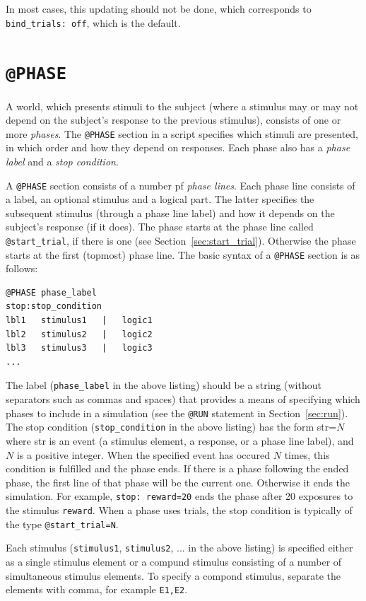 \documentclass[11pt]{article}
\newcommand{\scr}[1]{\lstinline|#1|}
\begin{document}
In most cases, this updating should not be done, which corresponds to \scr{bind_trials: off}, which is the default.

\section{\texttt{@PHASE}}
\label{sec:phase}
A world, which presents stimuli to the subject (where a stimulus may or may not depend on the subject's response to the previous stimulus), consists of one or more \emph{phases}. The 
\verb|@PHASE| section in a script specifies which stimuli are presented, in which order and how they depend on responses. Each phase also has a \emph{phase label} and a \emph{stop condition}.

A \verb|@PHASE| section consists of a number pf \emph{phase lines}. Each phase line consists of a label, an optional stimulus and a logical part. The latter specifies the subsequent stimulus (through a phase line label) and how it depends on the subject's response (if it does). The phase starts at the phase line called \scr{@start_trial}, if there is one (see Section~\ref{sec:start_trial}). Otherwise the phase starts at the first (topmost) phase line. The basic syntax of a \verb|@PHASE| section is as follows:

\begin{lstlisting}[caption={The basic syntax of a \texttt{@PHASE} section}]
@PHASE phase_label
stop:stop_condition
lbl1   stimulus1   |   logic1
lbl2   stimulus2   |   logic2
lbl3   stimulus3   |   logic3
...
\end{lstlisting}
The label (\verb|phase_label| in the above listing) should be a string (without separators such as commas and spaces) that provides a means of specifying which phases to include in a simulation (see the \verb|@RUN| statement in Section~\ref{sec:run}). The stop condition (\verb|stop_condition| in the above listing) has the form str=$N$ where str is an event (a stimulus element, a response, or a phase line label), and $N$ is a positive integer. When the specified event has occured $N$ times, this condition is fulfilled and the phase ends. If there is a phase following the ended phase, the first line of that phase will be the current one. Otherwise it ends the simulation. For example,  \verb|stop: reward=20| ends the phase after 20 exposures to the stimulus \verb|reward|. When a phase uses trials, the stop condition is typically of the type \scr{@start_trial=N}.

Each stimulus (\verb|stimulus1|, \verb|stimulus2|, ... in the above listing) is specified either as a single stimulus element or a compund stimulus consisting of a number of simultaneous stimulus elements. To specify a compond stimulus, separate the elements with comma, for example \verb|E1,E2|. 
\end{document}

